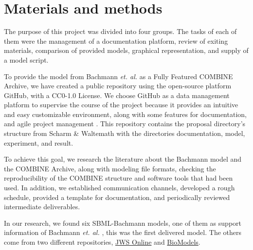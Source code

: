 \section*{Materials and methods}

The purpose of this project was divided into four groups. The tasks of each of them were the management of a documentation platform, review of exiting materials, comparison of provided models, graphical representation, and supply of a model script.

To provide the model from Bachmann \textit{et. al.}\cite{bachmannmodel} as a Fully Featured COMBINE Archive, we have created a public repository using the open-source platform GitHub, with a CC0-1.0 License. We choose GitHub as a data management platform to supervise the course of the project because it provides an intuitive and easy customizable environment, along with some features for documentation, and agile project management \cite{github}. This repository contains the proposal directory's structure from Scharm \& Waltemath \cite{combine} with the directories documentation, model, experiment, and result.

To achieve this goal, we research the literature about the Bachmann model and the COMBINE Archive, along with modeling file formats, checking the reproducibility of the COMBINE structure and software tools that had been used. In addition, we established communication channels, developed a rough schedule, provided a template for documentation, and periodically reviewed intermediate deliverables. 

In our research, we found six SBML-Bachmann models, one of them as support information of Bachmann \textit{et. al.} \cite{bachmannmodel}, this was the first delivered model. The others come from two different repositories, \hyperlink{https://www.systemsmedicine.net/posts/jws-online-biological-systems-modelling}{JWS Online} and \hyperlink{https://www.ebi.ac.uk/biomodels/}{BioModels}.